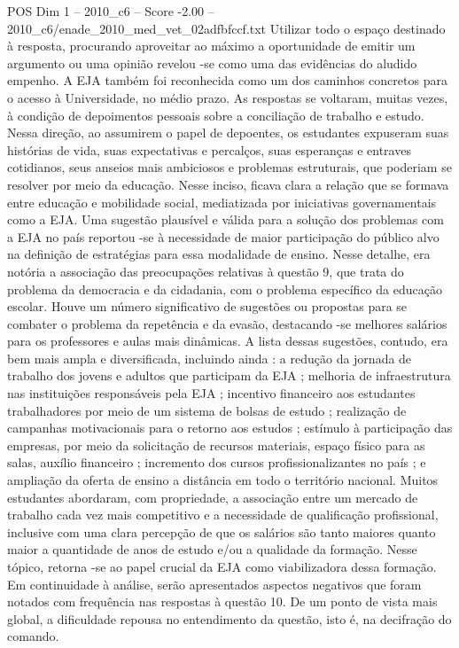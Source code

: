 \begin{textsample}{POS Dim 1 – 2010\_c6 – Score -2.00 – 2010\_c6/enade\_2010\_med\_vet\_02adfbfccf.txt}
Utilizar todo o espaço destinado à resposta, procurando aproveitar ao máximo a oportunidade de emitir um argumento ou uma opinião revelou -se como uma das evidências do aludido empenho.
A EJA também foi reconhecida como um dos caminhos concretos para o acesso à Universidade, no médio prazo.
As respostas se voltaram, muitas vezes, à condição de depoimentos pessoais sobre a conciliação de trabalho e estudo.
Nessa direção, ao assumirem o papel de depoentes, os estudantes expuseram suas histórias de vida, suas expectativas e percalços, suas esperanças e entraves cotidianos, seus anseios mais ambiciosos e problemas estruturais, que poderiam se resolver por meio da educação.
Nesse inciso, ficava clara a relação que se formava entre educação e mobilidade social, mediatizada por iniciativas governamentais como a EJA.
Uma sugestão plausível e válida para a solução dos problemas com a EJA no país reportou -se à necessidade de maior participação do público alvo na definição de estratégias para essa modalidade de ensino.
Nesse detalhe, era notória a associação das preocupações relativas à questão 9, que trata do problema da democracia e da cidadania, com o problema específico da educação escolar.
Houve um número significativo de sugestões ou propostas para se combater o problema da repetência e da evasão, destacando -se melhores salários para os professores e aulas mais dinâmicas.
A lista dessas sugestões, contudo, era bem mais ampla e diversificada, incluindo ainda : a redução da jornada de trabalho dos jovens e adultos que participam da EJA ; melhoria de infraestrutura nas instituições responsáveis pela EJA ; incentivo financeiro aos estudantes trabalhadores por meio de um sistema de bolsas de estudo ; realização de campanhas motivacionais para o retorno aos estudos ; estímulo à participação das empresas, por meio da solicitação de recursos materiais, espaço físico para as salas, auxílio financeiro ; incremento dos cursos profissionalizantes no país ; e ampliação da oferta de ensino a distância em todo o território nacional.
Muitos estudantes abordaram, com propriedade, a associação entre um mercado de trabalho cada vez mais competitivo e a necessidade de qualificação profissional, inclusive com uma clara percepção de que os salários são tanto maiores quanto maior a quantidade de anos de estudo e/ou a qualidade da formação.
Nesse tópico, retorna -se ao papel crucial da EJA como viabilizadora dessa formação.
Em continuidade à análise, serão apresentados aspectos negativos que foram notados com frequência nas respostas à questão 10.
De um ponto de vista mais global, a dificuldade repousa no entendimento da questão, isto é, na decifração do comando.

\end{textsample}
